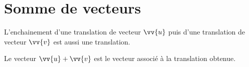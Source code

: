 \documentclass[main.tex]{subfiles}
\begin{document}





%	 

\newpage 
{}  
\pagestyle{scrheadings} %
\onehalfspacing


\section{Somme de vecteurs}
\begin{theorem}
L'enchainement d'une translation de vecteur $\vv{u}$ puis d'une translation de vecteur $\vv{v}$ est aussi une translation.

Le vecteur $\vv{u}+\vv{v}$ est le vecteur associé à la translation obtenue.
\end{theorem} 
\end{document}

